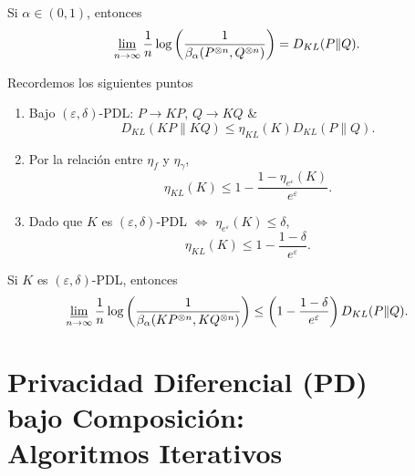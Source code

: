 \begin{lemma}\cite{polyanskiy2014lecture,asoodeh2020contraction}
Si $\alpha\in(0,1)$, entonces
\begin{equation*}
    \varliminf _{n\rightarrow \infty }\frac{1}{n}\log\left(\frac{1}{\beta_\alpha(P^{\otimes n},Q^{\otimes n})}\right)=D_{KL}(P\|Q).
\end{equation*}
\end{lemma}
\begin{observation}\cite{polyanskiy2014lecture,asoodeh2020contraction}
Recordemos los siguientes puntos
    \begin{enumerate}[label=(\alph*)]
        \item Bajo $(\varepsilon,\delta)$-PDL: $P\to KP$, $Q\to KQ$ \&
        \begin{equation*}
            D_{KL}(KP\|KQ)\leq\eta_{KL}(K)D_{KL}(P\|Q).
        \end{equation*}
        \item Por la relaci\'on entre $\eta_f$ y $\eta_\gamma$,
        \begin{equation*}
            \eta_{KL}(K)\leq1-\frac{1-\eta_{e^{\varepsilon}}(K)}{e^{\varepsilon}}.
        \end{equation*}
        \item Dado que $K$ es $(\varepsilon,\delta)$-PDL $\iff$ $\eta_{e^{\varepsilon}}(K)\leq\delta$,
        \begin{equation*}
            \eta_{KL}(K)\leq1-\frac{1-\delta}{e^\varepsilon}.
        \end{equation*}
    \end{enumerate}
\end{observation}

\begin{theorem}\cite{polyanskiy2014lecture,asoodeh2020contraction}
    Si $K$ es $(\varepsilon,\delta)$-PDL, entonces
    \begin{equation*}
        \varliminf_{n\to\infty}\frac{1}{n}\log\left(\frac{1}{\beta_\alpha(KP^{\otimes n},KQ^{\otimes n})}\right)\leq\left(1-\frac{1-\delta}{e^\varepsilon}\right)D_{KL}(P\|Q).
    \end{equation*}
\end{theorem}
\section{Privacidad Diferencial (PD)\\
bajo Composici\'on:\\
Algoritmos Iterativos}

